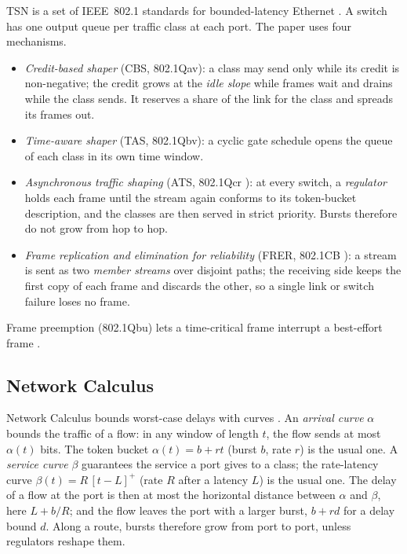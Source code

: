TSN is a set of IEEE~802.1 standards for bounded-latency Ethernet
\cite{ieee8021q2022}. A switch has one output queue per traffic class at
each port. The paper uses four mechanisms.
\begin{itemize}
\item \emph{Credit-based shaper} (CBS, 802.1Qav): a class may send only
while its credit is non-negative; the credit grows at the \emph{idle
slope} while frames wait and drains while the class sends. It reserves a
share of the link for the class and spreads its frames out.
\item \emph{Time-aware shaper} (TAS, 802.1Qbv): a cyclic gate schedule
opens the queue of each class in its own time window.
\item \emph{Asynchronous traffic shaping} (ATS, 802.1Qcr
\cite{ieee8021qcr2020,specht2016urgency}): at every switch, a
\emph{regulator} holds each frame until the stream again conforms to its
token-bucket description, and the classes are then served in strict
priority. Bursts therefore do not grow from hop to hop.
\item \emph{Frame replication and elimination for reliability} (FRER,
802.1CB \cite{ieee8021cb2017}): a stream is sent as two \emph{member
streams} over disjoint paths; the receiving side keeps the first copy of
each frame and discards the other, so a single link or switch failure
loses no frame.
\end{itemize}
Frame preemption (802.1Qbu) lets a time-critical frame interrupt a
best-effort frame \cite{thiele2016formal}.

\subsection{Network Calculus}

Network Calculus bounds worst-case delays with curves
\cite{cruz1991calculus,leboudec2001network}. An \emph{arrival curve}
$\alpha$ bounds the traffic of a flow: in any window of length $t$, the
flow sends at most $\alpha(t)$ bits. The token bucket $\alpha(t)=b+rt$
(burst $b$, rate $r$) is the usual one. A \emph{service curve} $\beta$
guarantees the service a port gives to a class; the rate-latency curve
$\beta(t)=R\,[t-L]^+$ (rate $R$ after a latency $L$) is the usual one.
The delay of a flow at the port is then at most the horizontal distance
between $\alpha$ and $\beta$, here $L+b/R$; and the flow leaves the port
with a larger burst, $b+rd$ for a delay bound $d$. Along a route, bursts
therefore grow from port to port, unless regulators reshape them.

